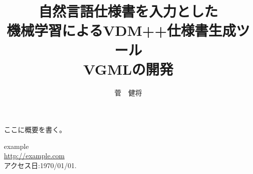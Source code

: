 \documentclass[uplatex, report, a4j, 10pt]{jsbook}
\title{自然言語仕様書を入力とした\\機械学習によるVDM++仕様書生成ツール\\VGMLの開発}
\author{菅　健将}
\begin{document}
\maketitle

%
% 
ここに概要を書く。


%
% 








%


%
\begin{thebibliography}{0}
	example\\
	\url{http://example.com}\\アクセス日:1970/01/01.
\end{thebibliography}

\end{document}
